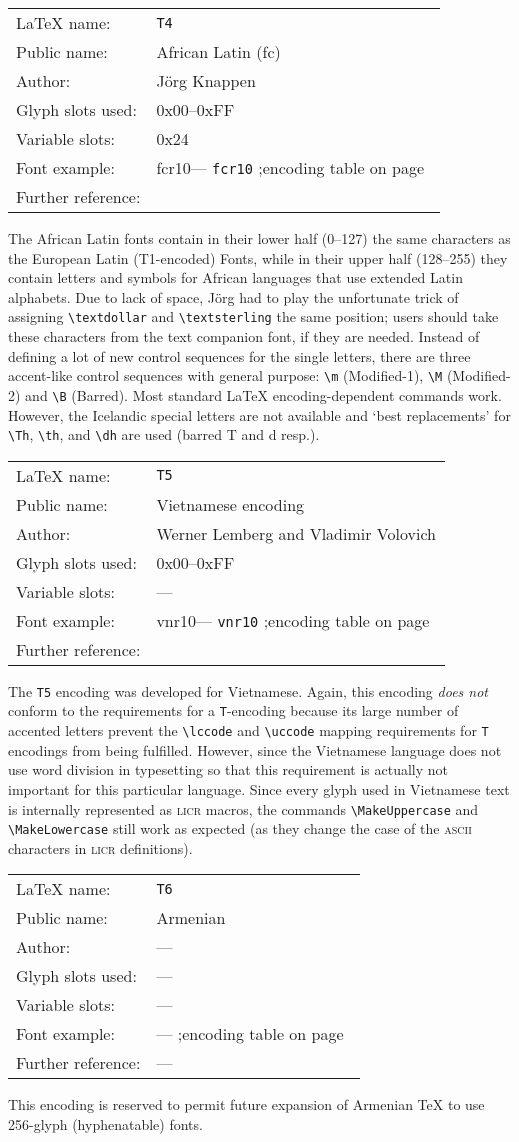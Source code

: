 \documentclass{ltxguide}[1994/11/20]
\makeatletter
\providecommand{\Enc}[1]{\texttt{#1}}
\newenvironment{encodinginfo}[7]%
  {\noindent
   \begin{tabularx}{\linewidth}{@{}l>{\raggedright\let\\\tabularnewline}X}%
     \LaTeX{} name:          & \texttt{#1}\\%
     Public name:          & #2\\%
     Author:                   & #3\\%
     Glyph slots used: & #4\\%
     Variable slots:     & #5\\%
     Font example:     & \def\@tempa{#6}\ifx\@tempa\@empty---%
                            \else\texttt{#6}\referenceftable{#6}\fi\\%
     Further reference:                & #7%
   \end{tabularx}%
   \par\nobreak
   \vspace*{3pt}%
   \quote
  }%
  {\endquote
   \vspace{6pt}}
\def\referenceftable#1{
  \@ifundefined{r@fonttable:#1}%
  \relax
  {;\space encoding table on page~\pageref{fonttable:#1}}%
}
\makeatother
\begin{document}
\begin{encodinginfo}{T4}
        {African Latin (fc)}              %
        {J\"org Knappen}              %
        {0x00--0xFF}              %
        {0x24}         %
        {fcr10}              %
        {\cite{tub:JKn93}}

The African Latin fonts contain in their lower half (0--127) the same
characters as the European Latin (T1-encoded) Fonts, while in their
upper half (128--255) they
contain letters and symbols for African languages that use extended
Latin alphabets.
Due to lack of space, J\"org had to play the unfortunate trick of
assigning \verb=\textdollar= and \verb=\textsterling=
the same position; users should take these characters
from the text companion font, if they are needed.  Instead of defining
a lot of new control sequences for the single letters, there are three
accent-like control sequences with general purpose:
\verb=\m= (Modified-1),
\verb=\M= (Modified-2) and
\verb=\B= (Barred).
Most standard \LaTeX{} encoding-dependent commands
work.  However, the Icelandic special letters are not available and `best
replacements' for \verb=\Th=, \verb=\th=, and \verb=\dh=
are used (barred T and d resp.).
\end{encodinginfo}


\begin{encodinginfo}{T5}
        {Vietnamese encoding}
        {Werner Lemberg and
         Vladimir Volovich}
        {0x00--0xFF}
        {---}
        {vnr10}
        {\cite{vnr}}

  The \Enc{T5} encoding was developed for Vietnamese. Again, this encoding
  \emph{does not} conform to the requirements for a \Enc{T}-encoding
  because its large number of accented letters prevent the \verb=\lccode= and
  \verb=\uccode= mapping requirements for \Enc{T} encodings from being
  fulfilled.  However, since the Vietnamese language does not
  use word division in typesetting so that this requirement is
  actually not important for this particular language.
  Since every glyph used in Vietnamese text is internally
  represented as \textsc{licr} macros, the commands  \verb=\MakeUppercase= and
  \verb=\MakeLowercase= still work as expected (as they change the case of the
  \textsc{ascii} characters in \textsc{licr} definitions).

\end{encodinginfo}

\begin{encodinginfo}
  {T6}
  {Armenian}
  {---}
  {---}
  {---}
  {}
  {---}

    This encoding is reserved to permit future expansion of Armenian
  \TeX{} to use 256-glyph (hyphenatable) fonts.
\end{encodinginfo}
\end{document}
